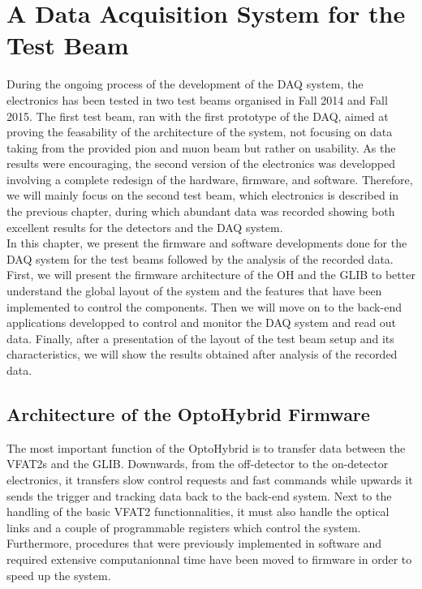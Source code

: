 \chapter{A Data Acquisition System for the Test Beam}
\label{chap:II-3-test-beam}

  During the ongoing process of the development of the DAQ system, the electronics has been tested in two test beams organised in Fall 2014 and Fall 2015. The first test beam, ran with the first prototype of the DAQ, aimed at proving the feasability of the architecture of the system, not focusing on data taking from the provided pion and muon beam but rather on usability. As the results were encouraging, the second version of the electronics was developped involving a complete redesign of the hardware, firmware, and software. Therefore, we will mainly focus on the second test beam, which electronics is described in the previous chapter, during which abundant data was recorded showing both excellent results for the detectors and the DAQ system. \\

  In this chapter, we present the firmware and software developments done for the DAQ system for the test beams followed by the analysis of the recorded data. First, we will present the firmware architecture of the OH and the GLIB to better understand the global layout of the system and the features that have been implemented to control the components. Then we will move on to the back-end applications developped to control and monitor the DAQ system and read out data. Finally, after a presentation of the layout of the test beam setup and its characteristics, we will show the results obtained after analysis of the recorded data.

  \section{Architecture of the OptoHybrid Firmware}

    The most important function of the OptoHybrid is to transfer data between the VFAT2s and the GLIB. Downwards, from the off-detector to the on-detector electronics, it transfers slow control requests and fast commands while upwards it sends the trigger and tracking data back to the back-end system. Next to the handling of the basic VFAT2 functionnalities, it must also handle the optical links and a couple of programmable registers which control the system. Furthermore, procedures that were previously implemented in software and required extensive computanionnal time have been moved to firmware in order to speed up the system. \\

